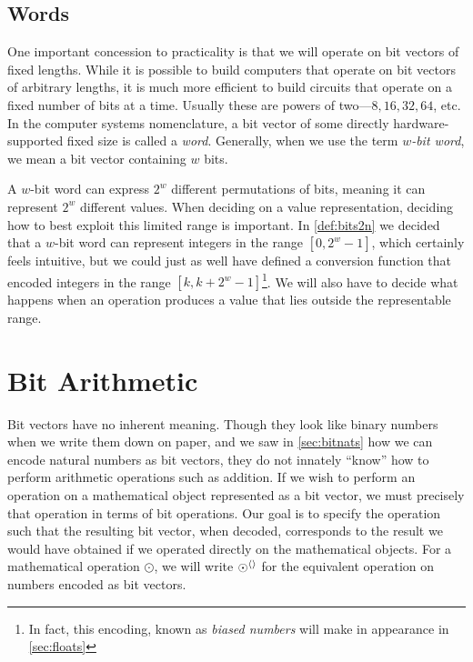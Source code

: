 \subsection{Words}
\label{sec:words}

One important concession to practicality is that we will operate on
bit vectors of fixed lengths.  While it is possible to build computers
that operate on bit vectors of arbitrary lengths, it is much more
efficient to build circuits that operate on a fixed number of bits at
a time.  Usually these are powers of two---$8,16,32,64$, etc.  In the
computer systems nomenclature, a bit vector of some directly
hardware-supported fixed size is called a \emph{word}.  Generally,
when we use the term \emph{$w$-bit word}, we mean a bit vector
containing $w$ bits.

A $w$-bit word can express $2^{w}$ different permutations of bits,
meaning it can represent $2^{w}$ different values.  When deciding on a
value representation, deciding how to best exploit this limited range
is important.  In \cref{def:bits2n} we decided that a $w$-bit word can
represent integers in the range $[0,2^{w}-1]$, which certainly feels
intuitive, but we could just as well have defined a conversion
function that encoded integers in the range
$[k,k+2^{w}-1]$\footnote{In fact, this encoding, known as \emph{biased
    numbers} will make in appearance in \cref{sec:floats}}.  We will
also have to decide what happens when an operation produces a value
that lies outside the representable range.

\section{Bit Arithmetic}
\label{sec:bit-arithmetic}

Bit vectors have no inherent meaning.  Though they look like binary
numbers when we write them down on paper, and we saw in
\cref{sec:bitnats} how we can encode natural numbers as bit vectors,
they do not innately ``know'' how to perform arithmetic operations
such as addition.  If we wish to perform an operation on a
mathematical object represented as a bit vector, we must precisely
that operation in terms of bit operations.  Our goal is to specify the
operation such that the resulting bit vector, when decoded,
corresponds to the result we would have obtained if we operated
directly on the mathematical objects.  For a mathematical operation
$\odot$, we will write $\operatorname{\odot^{\langle\rangle}}$ for the equivalent operation on
numbers encoded as bit vectors.

